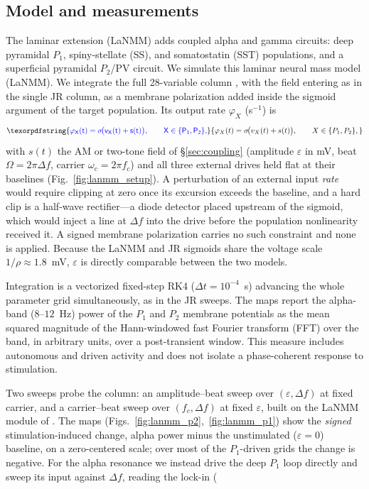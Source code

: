 \documentclass[11pt,a4paper]{article}
\newif\ifsupp
\newcommand{\Sig}{\sigma}
\providecommand{\DIFaddtex}[1]{{\protect\color{blue} \sf #1}} %
\providecommand{\DIFadd}[1]{\texorpdfstring{\DIFaddtex{#1}}{#1}} %
\begin{document}
\subsection{\DIFadd{Model and measurements}}\label{sec:lanmm-methods}
\DIFadd{The laminar extension (LaNMM)
\cite{ruffini2025cfc,sanchezTodo2023} adds coupled alpha and gamma circuits: deep
pyramidal $P_1$, spiny-stellate (SS), and somatostatin (SST) populations, and a
superficial pyramidal $P_2$/PV circuit.
We simulate this laminar neural mass model (LaNMM). We integrate the full 28-variable column
\cite{ruffini2025cfc,sanchezTodo2023}, with the field entering as in the single
JR column, as a membrane polarization added inside the sigmoid argument of the target
population. Its output rate $\varphi_X$ (s$^{-1}$) is
}\begin{equation}
\DIFadd{\varphi_X(t)=\Sig\!\big(v_X(t)+s(t)\big),\qquad X\in\{P_1,P_2\},
\label{eq:lanmm_drive}
}\end{equation}
\DIFadd{with $s(t)$ the AM or two-tone field of \S\ref{sec:coupling} (amplitude $\varepsilon$ in
mV, beat $\Omega=2\pi\Delta f$, carrier $\omega_c=2\pi f_c$) and all three external drives
held flat at their baselines (Fig.~\ref{fig:lanmm_setup}). A perturbation of an external
input \emph{rate} would require clipping at zero
once its excursion exceeds the baseline, and a hard clip is a half-wave rectifier---a
diode detector placed upstream of the sigmoid, which would inject a line at $\Delta f$
into the drive before the population nonlinearity received it. A signed membrane
polarization carries no such constraint and none is applied. Because the LaNMM and JR
sigmoids share the voltage scale $1/\rho\approx1.8$~mV, $\varepsilon$ is directly
comparable between the two models.
}

\DIFadd{Integration is a vectorized fixed-step RK4
($\Delta t=10^{-4}$~s) advancing the whole parameter grid simultaneously, as in the JR
sweeps. The maps report the
alpha-band ($8$--$12$~Hz) power of the $P_1$ and $P_2$ membrane potentials as the mean
squared magnitude of the Hann-windowed fast Fourier transform (FFT) over the band, in arbitrary units, over a
post-transient window. This measure includes autonomous and driven activity and
does not isolate a phase-coherent response to stimulation.
}

\DIFadd{Two sweeps probe the column: an amplitude--beat sweep over
$(\varepsilon,\Delta f)$ at fixed carrier, and a carrier--beat sweep
over $(f_c,\Delta f)$ at fixed $\varepsilon$, built on the LaNMM module of
\cite{ruffini2025cfc}. The maps
(Figs.~\ref{fig:lanmm_p2},~\ref{fig:lanmm_p1}) show the \emph{signed} stimulation-induced
change, alpha power minus the unstimulated ($\varepsilon=0$) baseline, on a zero-centered
scale; over most of the $P_1$-driven grids the change is negative. For the
alpha resonance we instead drive the deep $P_1$ loop directly and sweep its input against
$\Delta f$, reading the lock-in (}\ifsupp \DIFadd{main-text}\fi{}
\end{document}
